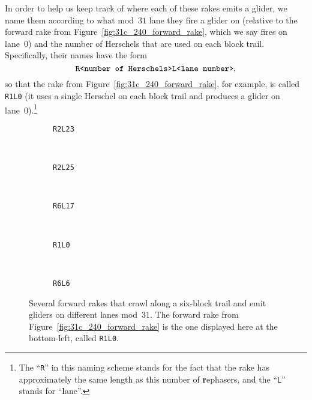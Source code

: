 In order to help us keep track of where each of these rakes emits a glider, we name them according to what mod~$31$ lane they fire a glider on (relative to the forward rake from Figure~\ref{fig:31c_240_forward_rake}, which we say fires on lane~$0$) and the number of Herschels that are used on each block trail. Specifically, their names have the form
\[
	\text{\texttt{R<number of Herschels>L<lane number>}},
\]
so that the rake from Figure~\ref{fig:31c_240_forward_rake}, for example, is called \texttt{R1L0} (it uses a single Herschel on each block trail and produces a glider on lane~0).\footnote{The ``\texttt{R}'' in this naming scheme stands for the fact that the rake has approximately the same length as this number of \textbf{r}ephasers, and the ``\texttt{L}'' stands for ``\textbf{l}ane''.}

\begin{figure}[!htb]
	\centering
	\begin{minipage}{0.3\textwidth}
		\begin{subfigure}{\linewidth}
			\centering
			\caption{\texttt{R2L23}}\label{fig:R2L23}
		\end{subfigure} \\[0.1cm] \begin{subfigure}{\linewidth}
			\centering
			\caption{\texttt{R2L25}}\label{fig:R2L25}
		\end{subfigure}
	\end{minipage} \ \ \ \begin{subfigure}{0.66\textwidth}
		\centering
		\caption{\texttt{R6L17}}\label{fig:R6L17}
	\end{subfigure} \\[0.1cm]
	\begin{subfigure}{0.3\textwidth}
		\centering
		\caption{\texttt{R1L0}}\label{fig:R1L0}
	\end{subfigure} \ \ \ \begin{subfigure}{0.66\textwidth}
		\centering
		\caption{\texttt{R6L6}}\label{fig:R6L6}
	\end{subfigure}
	\caption{Several forward rakes that crawl along a six-block trail and emit gliders on different lanes mod~$31$. The forward rake from Figure~\ref{fig:31c_240_forward_rake} is the one displayed here at the bottom-left, called \texttt{R1L0}.}\label{fig:31c_240_forerakes}
\end{figure}

